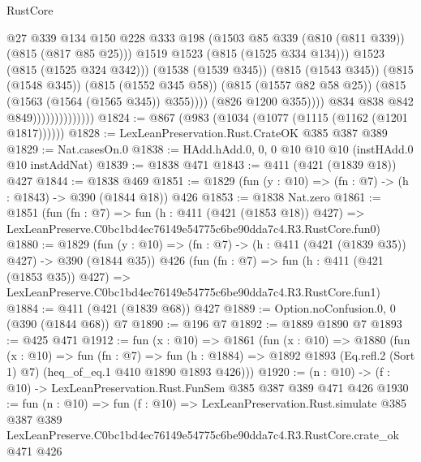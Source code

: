 \begin{lexlean}{RustCore}
\begin{coremodule}
                                              @27
                                              @339
                                              @134
                                              @150
                                              @228
                                              @333
                                              @198
                                              (@1503
                                                @85
                                                @339
                                                (@810 (@811 @339))
                                                (@815 (@817 @85 @25)))
                                              @1519
                                              @1523
                                              (@815 (@1525 @334 @134)))
                                            @1523
                                            (@815 (@1525 @324 @342)))
                                          (@1538 (@1539 @345))
                                          (@815 (@1543 @345))
                                          (@815 (@1548 @345))
                                          (@815 (@1552 @345 @58))
                                          (@815 (@1557 @82 @58 @25))
                                          (@815 (@1563 (@1564 (@1565 @345)) @355))))
                                      (@826 @1200 @355))))
                                @834
                                @838
                                @842
                                @849))))))))))))))
@1824 := @867 (@983 (@1034 (@1077 (@1115 (@1162 (@1201 @1817))))))
@1828 := LexLeanPreservation.Rust.CrateOK @385 @387 @389
@1829 := Nat.casesOn.{0}
@1838 := HAdd.hAdd.{0, 0, 0} @10 @10 @10 (instHAdd.{0} @10 instAddNat)
@1839 := @1838 @471
@1843 := @411 (@421 (@1839 @18)) @427
@1844 := @1838 @469
@1851 := @1829 (fun (y : @10) => (fn : @7) -> (h : @1843) -> @390 (@1844 @18)) @426
@1853 := @1838 Nat.zero
@1861 := @1851
    (fun (fn : @7) =>
    fun (h : @411 (@421 (@1853 @18)) @427) =>
    LexLeanPreserve.C0bc1bd4ec76149e54775c6be90dda7c4.R3.RustCore.fun0)
@1880 := @1829
    (fun (y : @10) => (fn : @7) -> (h : @411 (@421 (@1839 @35)) @427) -> @390 (@1844 @35))
    @426
    (fun (fn : @7) =>
    fun (h : @411 (@421 (@1853 @35)) @427) =>
    LexLeanPreserve.C0bc1bd4ec76149e54775c6be90dda7c4.R3.RustCore.fun1)
@1884 := @411 (@421 (@1839 @68)) @427
@1889 := Option.noConfusion.{0, 0} (@390 (@1844 @68)) @7
@1890 := @196 @7
@1892 := @1889 @1890 @7
@1893 := @425 @471
@1912 := fun (x : @10) =>
  @1861
    (fun (x : @10) =>
    @1880
      (fun (x : @10) =>
      fun (fn : @7) =>
      fun (h : @1884) =>
      @1892 @1893 (Eq.refl.{2} (Sort 1) @7) (heq_of_eq.{1} @410 @1890 @1893 @426)))
@1920 := (n : @10) -> (f : @10) -> LexLeanPreservation.Rust.FunSem @385 @387 @389 @471 @426
@1930 := fun (n : @10) =>
  fun (f : @10) =>
  LexLeanPreservation.Rust.simulate
    @385
    @387
    @389
    LexLeanPreserve.C0bc1bd4ec76149e54775c6be90dda7c4.R3.RustCore.crate_ok
    @471
    @426
\end{coremodule}
\end{lexlean}
